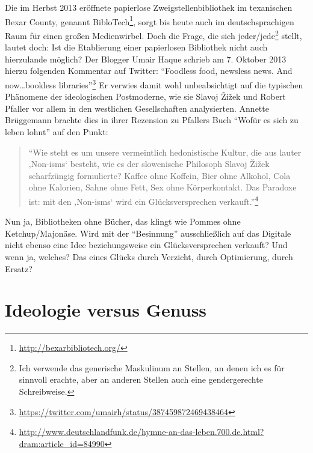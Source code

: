 \documentclass[a4paper,
fontsize=11pt,
oneside,
numbers=noperiodatend,
parskip=half-,
bibliography=totoc,
final
]{scrartcl}
\begin{document}
Die im Herbst 2013 eröffnete papierlose Zweigstellenbibliothek im
texanischen Bexar County, genannt BibloTech\footnote{\url{http://bexarbibliotech.org/}},
sorgt bis heute auch im deutschsprachigen Raum für einen großen
Medienwirbel. Doch die Frage, die sich jeder/jede\footnote{Ich verwende
  das generische Maskulinum an Stellen, an denen ich es für sinnvoll
  erachte, aber an anderen Stellen auch eine gendergerechte
  Schreibweise.} stellt, lautet doch: Ist die Etablierung einer
papierlosen Bibliothek nicht auch hierzulande möglich? Der Blogger Umair
Haque schrieb am 7. Oktober 2013 hierzu folgenden Kommentar auf Twitter:
\enquote{Foodless food, newsless news. And now\ldots{}bookless
libraries}\footnote{\url{https://twitter.com/umairh/status/387459872469438464}}
Er verwies damit wohl unbeabsichtigt auf die typischen Phänomene der
ideologischen Postmoderne, wie sie Slavoj Žižek und Robert Pfaller vor
allem in den westlichen Gesellschaften analysierten. Annette Brüggemann
brachte dies in ihrer Rezension zu Pfallers Buch \enquote{Wofür es sich
zu leben lohnt} auf den Punkt:~

\begin{quote}
\enquote{Wie steht es um unsere vermeintlich hedonistische Kultur, die
aus lauter ‚Non-isms` besteht, wie es der slowenische Philosoph Slavoj
Žižek scharfzüngig formulierte? Kaffee ohne Koffein, Bier ohne Alkohol,
Cola ohne Kalorien, Sahne ohne Fett, Sex ohne Körperkontakt. Das
Paradoxe ist: mit den ‚Non-isms` wird ein Glücksversprechen
verkauft.}\footnote{\url{http://www.deutschlandfunk.de/hymne-an-das-leben.700.de.html?dram:article\_id=84990}}
\end{quote}

Nun ja, Bibliotheken ohne Bücher, das klingt wie Pommes ohne
Ketchup/Majonäse. Wird mit der \enquote{Besinnung} ausschließlich auf
das Digitale nicht ebenso eine Idee beziehungsweise ein
Glücksversprechen verkauft? Und wenn ja, welches? Das eines Glücks durch
Verzicht, durch Optimierung, durch Ersatz?

\section{Ideologie versus Genuss}\label{ideologie-versus-genuss}
\end{document}
